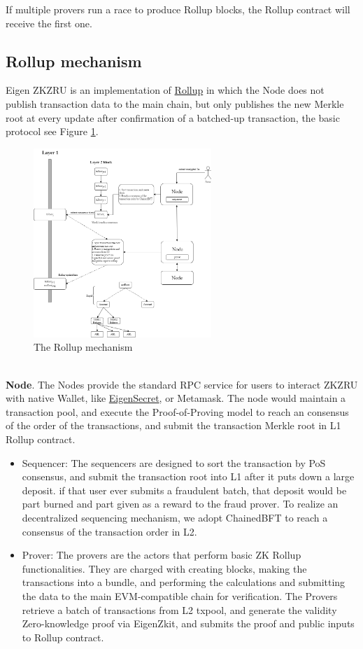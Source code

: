 \documentclass{article}
\begin{document}
If multiple provers run a race to produce Rollup blocks, the Rollup contract will receive the first one. 

\subsection{Rollup mechanism}

Eigen ZKZRU is an implementation of \href{https://vitalik.ca/general/2021/01/05/rollup.html}{Rollup} in which the Node does not publish transaction data to the main chain, but only publishes the new Merkle root at every update after confirmation of a batched-up transaction, the basic protocol see Figure \ref{fig:rollup}.

\begin{figure}
    \centering
    \includegraphics[width=0.6\textwidth]{rollup.drawio.png}
    \caption{\label{fig:rollup}The Rollup mechanism}
\end{figure}

~\\
\noindent\textbf{Node}. The Nodes provide the standard RPC service for users to interact ZKZRU with native Wallet, like \href{https://secret.eigen.cash}{EigenSecret}, or Metamask. The node would maintain a transaction pool, and execute the Proof-of-Proving model to reach an consensus of the order of the transactions, and submit the transaction Merkle root in L1 Rollup contract.

\begin{itemize}
    \item Sequencer: The sequencers are designed to sort the transaction by PoS consensus, and submit the transaction root into L1  after it puts down a large deposit. if that user ever submits a fraudulent batch, that deposit would be part burned and part given as a reward to the fraud prover. To realize an decentralized sequencing mechanism, we adopt ChainedBFT to reach a consensus of the transaction order in L2.
    \item Prover:  The provers are the actors that perform basic ZK Rollup functionalities. They are charged with creating blocks, making the transactions into a bundle, and performing the calculations and submitting the data to the main EVM-compatible chain for verification. The Provers retrieve a batch of transactions from L2 txpool, and generate the validity Zero-knowledge proof via EigenZkit, and submits the proof and public inputs to Rollup contract.
\end{itemize}
\end{document}
